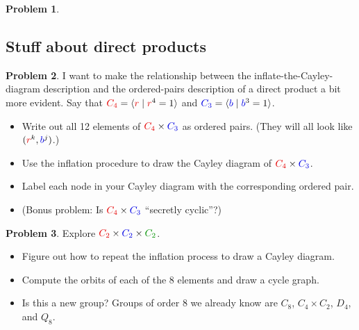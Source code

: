 \documentclass[12pt]{article}
\theoremstyle{definition} %
\newtheorem{problem}{Problem}
\newcommand{\Alert}[1]{\textcolor{xRed}{#1}}
\newcommand{\Balert}[1]{\textcolor{xBlue}{#1}}
\newcommand{\Galert}[1]{\textcolor{xGreen}{#1}}
\def\<{\langle}
\def\>{\rangle}
\begin{document}
\begin{problem}
\begin{itemize}
    \end{itemize}
    
\end{problem}

\subsection*{Stuff about direct products}

\begin{problem}
    I want to make the relationship between the inflate-the-Cayley-diagram description and the ordered-pairs description of a direct product a bit more evident. Say that $\Alert{C_4} = \<\Alert{r} \mid \Alert{r}^4 = 1\>$ and $\Balert{C_3} = \< \Balert{b} \mid \Balert{b}^3 = 1\>$. 
    \begin{itemize}
        \item Write out all 12 elements of $\Alert{C_4}\times \Balert{C_3}$ as ordered pairs. (They will all look like $(\Alert{r}^k, \Balert{b}^j)$.)
        \item Use the inflation procedure to draw the Cayley diagram of $\Alert{C_4}\times \Balert{C_3}$.
        \item Label each node in your Cayley diagram with the corresponding ordered pair.
        \item (Bonus problem: Is $\Alert{C_4}\times \Balert{C_3}$ ``secretly cyclic''?)
    \end{itemize}
\end{problem}

\begin{problem}
    Explore $\Alert{C_2} \times \Balert{C_2} \times \Galert{C_2}$.
    \begin{itemize}
        \item Figure out how to repeat the inflation process to draw a Cayley diagram.
        \item Compute the orbits of each of the 8 elements and draw a cycle graph.
        \item Is this a new group? Groups of order 8 we already know are $C_8$, $C_4 \times C_2$, $D_4$, and $Q_8$. 
    \end{itemize}
\end{problem}
\end{document}
